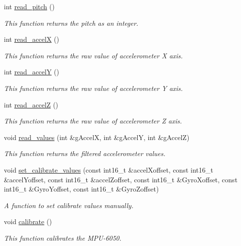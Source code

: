 \begin{DoxyCompactItemize}
int \mbox{\hyperlink{classi2c__mpu6050_a5337dde97dfb9e5c1f7025ff338fa5d3}{read\+\_\+pitch}} ()
\begin{DoxyCompactList}\small\item\em This function returns the pitch as an integer. \end{DoxyCompactList}\item 
int \mbox{\hyperlink{classi2c__mpu6050_a9f2b78a6174b02bbac22fd21cbd18574}{read\+\_\+accelX}} ()
\begin{DoxyCompactList}\small\item\em This function returns the raw value of accelerometer X axis. \end{DoxyCompactList}\item 
int \mbox{\hyperlink{classi2c__mpu6050_abe18e2ba5e0ceefa9462efbd46de4129}{read\+\_\+accelY}} ()
\begin{DoxyCompactList}\small\item\em This function returns the raw value of accelerometer Y axis. \end{DoxyCompactList}\item 
int \mbox{\hyperlink{classi2c__mpu6050_ab338d829847b1ffbeaddad82e56bb80e}{read\+\_\+accelZ}} ()
\begin{DoxyCompactList}\small\item\em This function returns the raw value of accelerometer Z axis. \end{DoxyCompactList}\item 
void \mbox{\hyperlink{classi2c__mpu6050_afd391b5f5322088d6831a05deaa6c4dd}{read\+\_\+values}} (int \&g\+AccelX, int \&g\+AccelY, int \&g\+AccelZ)
\begin{DoxyCompactList}\small\item\em This function returns the filtered accelerometer values. \end{DoxyCompactList}\item 
void \mbox{\hyperlink{classi2c__mpu6050_a232b262d69cb592aa65a1ed334104cc1}{set\+\_\+calibrate\+\_\+values}} (const int16\+\_\+t \&accel\+Xoffset, const int16\+\_\+t \&accel\+Yoffset, const int16\+\_\+t \&accel\+Zoffset, const int16\+\_\+t \&Gyro\+Xoffset, const int16\+\_\+t \&Gyro\+Yoffset, const int16\+\_\+t \&Gyro\+Zoffset)
\begin{DoxyCompactList}\small\item\em A function to set calibrate values manually. \end{DoxyCompactList}\item 
void \mbox{\hyperlink{classi2c__mpu6050_af52506caa980c3103c601640de1dee9a}{calibrate}} ()
\begin{DoxyCompactList}\small\item\em This function calibrates the M\+P\+U-\/6050. \end{DoxyCompactList}\end{DoxyCompactItemize}



